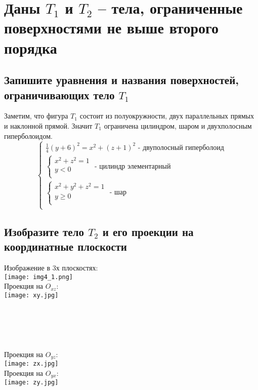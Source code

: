 \documentclass{article}
\begin{document}
\newpage
\section{Даны $T_1$ и $T_2$ – тела, ограниченные поверхностями не выше второго порядка}
    \subsection{Запишите уравнения и названия поверхностей, ограничивающих тело $T_1$}
        Заметим, что фигура $T_1$ состоит из полуокружности, двух параллельных прямых и наклонной прямой. Значит $T_1$ ограничена цилиндром, шаром и двухполосным гиперболоидом.
        \begin{equation*} 
        \begin{cases}
            \frac{1}{4}(y + 6)^2 = x^2 + (z + 1)^2 \text{ - двуполосный гиперболоид}\\ 
            \begin{cases}
                x^2 + z^2 = 1 \\
                y < 0 \\
            \end{cases} \text{ - цилиндр элементарный} \\
            \begin{cases}
                x^2 + y^2 + z^2 = 1 \\
                y \geq 0 \\
            \end{cases} \text{ - шар} \\
        \end{cases}
        \end{equation*}
    \subsection{Изобразите тело $T_2$ и его проекции на координатные плоскости}
        Изображение в 3х плоскостях: \\
        \texttt{[image: img4\_1.png]} \\
        Проекция на $O_{xz}$: \\
        \texttt{[image: xy.jpg]} \\ \\ \\ \\ \\ \\
        Проекция на $O_{yz}$: \\
        \texttt{[image: zx.jpg]} \\
        Проекция на $O_{yx}$: \\
        \texttt{[image: zy.jpg]} \\
    
\end{document}
